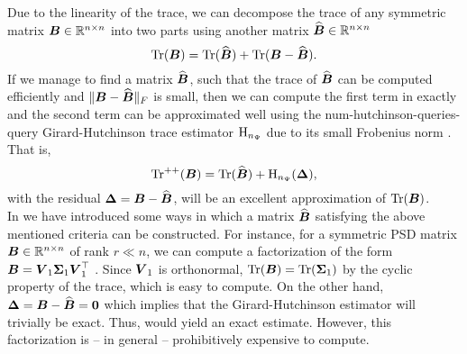 Due to the linearity of the trace, we can decompose the trace of any symmetric
matrix $\boldsymbol{B} \in \mathbb{R}^{n \times n}$ into two parts using another matrix
$\widehat{\boldsymbol{B}} \in \mathbb{R}^{n \times n}$
\begin{equation}
    \operatorname{Tr}(\boldsymbol{B}) = \operatorname{Tr}(\widehat{\boldsymbol{B}}) + \operatorname{Tr}(\boldsymbol{B} - \widehat{\boldsymbol{B}}).
    \label{equ:4-nystromchebyshev-trace-decomposition}
\end{equation}
If we manage to find a matrix $\widehat{\boldsymbol{B}}$, such that the trace of
$\widehat{\boldsymbol{B}}$ can be computed efficiently and
$\lVert \boldsymbol{B} - \widehat{\boldsymbol{B}} \rVert _F$ is small,
then we can compute the first term in 
exactly and the second term can be approximated well using
the \gls{num-hutchinson-queries}-query Girard-Hutchinson
trace estimator $\operatorname{H}_{n_{\Psi}}$ 
due to its small Frobenius norm .
That is,
\begin{equation}
    \operatorname{Tr}^{++}(\boldsymbol{B}) = \operatorname{Tr}(\widehat{\boldsymbol{B}}) + \operatorname{H}_{n_{\Psi}}(\boldsymbol{\Delta}),
    \label{equ:4-nystromchebyshev-hutch-pp}
\end{equation}
with the residual $\boldsymbol{\Delta} = \boldsymbol{B} - \widehat{\boldsymbol{B}}$, will be an excellent
approximation of $\operatorname{Tr}(\boldsymbol{B})$.\\

In  we have introduced
some ways in which a matrix $\widehat{\boldsymbol{B}}$ satisfying the above mentioned
criteria can be constructed. For instance, for a symmetric \gls{PSD} matrix $\boldsymbol{B} \in \mathbb{R}^{n \times n}$
of rank $r \ll n$, we can compute a factorization of the form
$\boldsymbol{B} = \boldsymbol{V}_1 \boldsymbol{\Sigma}_1 \boldsymbol{V}_1^{\top}$ .
Since $\boldsymbol{V}_1$ is orthonormal, $\operatorname{Tr}(\boldsymbol{B}) = \operatorname{Tr}(\boldsymbol{\Sigma}_1)$ by the
cyclic property of the trace, which is easy to compute. On the other hand,
$\boldsymbol{\Delta} = \boldsymbol{B} - \widehat{\boldsymbol{B}} = \boldsymbol{0}$ which implies that the
Girard-Hutchinson estimator will trivially be exact. Thus, 
would yield an exact estimate. However, this factorization is -- in general -- prohibitively expensive
to compute.\\

